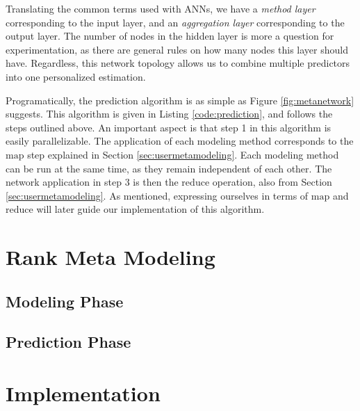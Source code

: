 

Translating the common terms used with ANNs, we have a \emph{method layer} corresponding to the input layer,
and an \emph{aggregation layer} corresponding to the output layer.
The number of nodes in the hidden layer is more a question for experimentation, as there are 
general rules on how many nodes this layer should have.
Regardless, this network topology allows us to combine multiple predictors into one personalized estimation.

Programatically, the prediction algorithm is as simple as Figure \ref{fig:metanetwork} suggests.
This algorithm is given in Listing \ref{code:prediction}, and follows the steps outlined above.
An important aspect is that step 1 in this algorithm is easily parallelizable. 
The application of each modeling method corresponds to the $\mathrm{map}$ step
explained in Section \ref{sec:usermetamodeling}.
Each modeling method can be run at the same time, as they remain independent of each other.
The network application in step 3 is then the $\mathrm{reduce}$ operation,
also from Section \ref{sec:usermetamodeling}.
As mentioned, expressing ourselves in terms of $\mathrm{map}$ and $\mathrm{reduce}$
will later guide our implementation of this algorithm.

\begin{figure*}
  
\end{figure*}





\section{Rank Meta Modeling}
\label{sec:methods:rank}

\subsection{Modeling Phase}

\subsection{Prediction Phase}

\section{Implementation}
